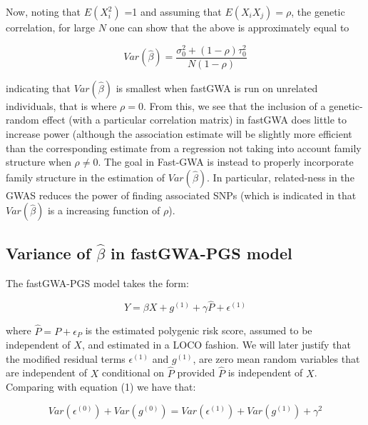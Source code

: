 \documentclass[10pt]{article}
\begin{document}
Now, noting that $E(X_{i}^2)$ =1 and assuming that $E(X_{i}X_{j})=\rho$, the genetic correlation, for large $N$ one can show that the above is approximately equal to

 \begin{equation}
Var(\hat{ \beta})= \frac{\sigma_{0}^2+(1-\rho)\tau_0^2}{N(1-\rho)}
\end{equation}

indicating that $Var(\hat{ \beta})$ is smallest when fastGWA is run on unrelated individuals, that is where $\rho=0$.  From this, we see that the inclusion of a genetic-random effect (with a particular correlation matrix) in fastGWA does little to increase power (although the association estimate will be slightly more efficient than the corresponding estimate from a regression not taking into account family structure when $\rho \neq 0$.  The goal in Fast-GWA is instead to properly incorporate family structure in the estimation of $Var(\hat{ \beta})$.  In particular, related-ness in the GWAS reduces the power of finding associated SNPs (which is indicated in that  $Var(\hat{ \beta})$ is a increasing function of $\rho$).



\subsection*{Variance of $\hat{\beta}$ in fastGWA-PGS model}

The fastGWA-PGS model takes the form:

\begin{equation}
Y = \beta X + g^{(1)} + \gamma \hat{P} + \epsilon^{(1)}  \label{eq:fastgwapgs}
\end{equation}

where $\hat{P} = P + \epsilon_{P}$ is the estimated polygenic risk score, assumed to be independent of $X$, and estimated in a LOCO fashion.  We will later justify that the modified residual terms   $\epsilon^{(1)}$ and $g^{(1)}$, are zero mean random variables that are independent of $X$ conditional on $\hat{P}$ provided $\hat{P}$ is independent of $X$.  Comparing with equation (1) we have that:

\begin{equation}
Var(\epsilon^{(0)})+Var(g^{(0)})= Var(\epsilon^{(1)})+Var(g^{(1)}) + \gamma^2
\end{equation}
\end{document}
